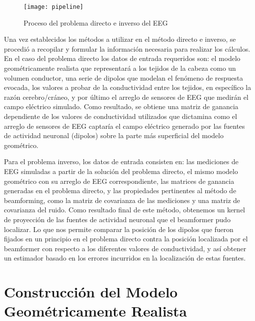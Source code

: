 \begin{figure}[tb]
	\centering
	\texttt{[image: pipeline]}
	\caption{Proceso del problema directo e inverso del EEG 
	}
	\label{fig:methodology:pipeline}
\end{figure}

Una vez establecidos los métodos a utilizar en el método directo e inverso, se procedió a recopilar y formular la información necesaria para realizar los cálculos. En el caso del problema directo los datos de entrada requeridos son: el modelo geométricamente realista que representará a los tejidos de la cabeza como un volumen conductor, una serie de dipolos que modelan el fenómeno de respuesta evocada, los valores a probar de la conductividad entre los tejidos, en específico la razón cerebro/cráneo, y por último el arreglo de sensores de EEG que medirán el campo eléctrico simulado. Como resultado, se obtiene una matriz de ganancia dependiente de los valores de conductividad utilizados que dictamina como el arreglo de sensores de EEG captaría el campo eléctrico generado por las fuentes de actividad neuronal (dipolos) sobre la parte más superficial del modelo geométrico.

Para el problema inverso, los datos de entrada consisten en: las mediciones de EEG simuladas a partir de la solución del problema directo, el mismo modelo geométrico con su arreglo de EEG correspondiente, las matrices de ganancia generadas en el problema directo, y las propiedades pertinentes al método de beamforming, como la matriz de covarianza de las mediciones y una matriz de covarianza del ruido. Como resultado final de este método, obtenemos un kernel de proyección de las fuentes de actividad neuronal que el beamformer pudo localizar. Lo que nos permite comparar la posición de los dipolos que fueron fijados en un principio en el problema directo contra la posición localizada por el beamformer con respecto a los diferentes valores de conductividad, y así obtener un estimador basado en los errores incurridos en la localización de estas fuentes.


\section{Construcción del Modelo Geométricamente Realista}
\label{sec:methodology:model}

